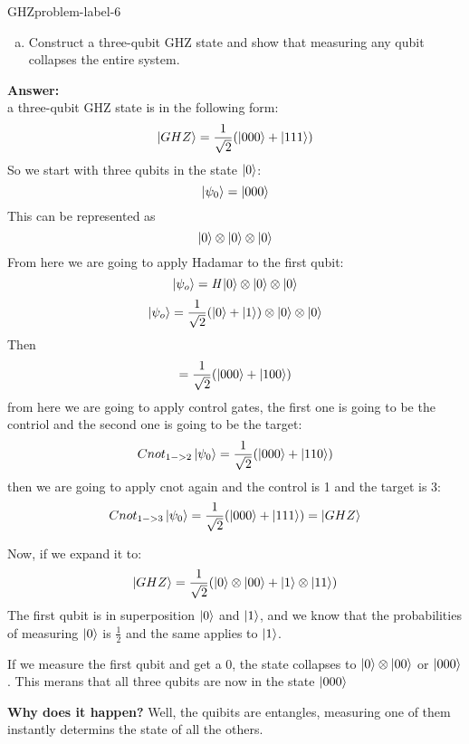 \newpage%
\begin{problem}{GHZ}{problem-label-6}
	
	\begin{enumerate}[(a)]
		\item Construct a three-qubit GHZ state and show that measuring any qubit collapses the entire system.
	\end{enumerate}
	\textbf{Answer:}\\
	a three-qubit GHZ state is in the following form:
	\[
	\ket{GHZ} = \frac{1}{\sqrt{2}}(\ket{000}+\ket{111})
	\]
	So we start with three qubits in the state $\ket{0}$:
	\[
	\ket{\psi_0} = \ket{000}
	\]
	This can be represented as 
	\[
	\ket{0}\otimes\ket{0}\otimes\ket{0}
	\]
	From here we are going to apply Hadamar to the first qubit:
	\[
	\ket{\psi_o} = \textit{H}\ket{0} \otimes \ket{0}\otimes\ket{0}
	\]
	\[
	\ket{\psi_o} = \frac{1}{\sqrt{2}}(\ket{0} + \ket{1}) \otimes \ket{0}\otimes\ket{0}
	\]
	Then 
	\[
	= \frac{1}{\sqrt{2}} (\ket{000}+ \ket{100})
	\]
	from here we are going to apply control gates, the first one is going to be the contriol and the second one is going to be the target:
	\[
	Cnot_{1->2}\ket{\psi_0} = \frac{1}{\sqrt{2}} (\ket{000}+ \ket{110})
	\]
	then we are going to apply cnot again and the control is 1 and the target is 3:
	\[
		Cnot_{1->3}\ket{\psi_0} = \frac{1}{\sqrt{2}} (\ket{000}+ \ket{111}) = \ket{GHZ}
	\]
	
	Now, if we expand it to:
	\[
	\ket{GHZ} = \frac{1}{\sqrt{2}} (\ket{0}\otimes\ket{00}+\ket{1}\otimes\ket{11})
	\]
	The first qubit is in superposition  $\ket{0}$ and $\ket{1}$, and we know that the probabilities of measuring $\ket{0}$ is $\frac{1}{2}$ and the same applies to $\ket{1}$.
	
	If we measure the first qubit and get a 0, the state collapses to $ \ket{0}\otimes\ket{00}$ or $\ket{000}$. This merans that all three qubits are now in the state $\ket{000}$
	
	\textbf{Why does it happen?} Well, the quibits are entangles, measuring one of them instantly determins the state of all the others.

\end{problem}

